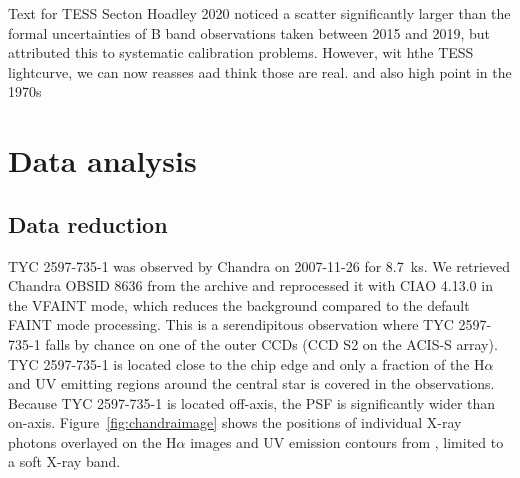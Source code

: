 \documentclass[linenumbers]{aastex631}
\begin{document}
Text for TESS Secton Hoadley 2020 noticed a scatter significantly larger than the formal uncertainties of B band observations taken between 2015 and 2019, but attributed this to systematic calibration problems. However, wit hthe TESS lightcurve, we can now reasses aad think those are real.  and also high point in the 1970s

\section{Data analysis} \label{sec:data}
\subsection{Data reduction}
TYC 2597-735-1 was observed by Chandra on 2007-11-26 for 8.7~ks. 
We retrieved Chandra OBSID 8636 from  the archive and reprocessed it with CIAO 4.13.0 \citep{2006SPIE.6270E..1VF} in the VFAINT mode, which reduces the background compared to the default FAINT mode processing. This is a serendipitous observation where TYC 2597-735-1 falls by chance on one of the outer CCDs (CCD S2 on the ACIS-S array). TYC 2597-735-1 is located close to the chip edge and only a fraction of the H$\alpha$ and UV emitting regions around the central star is covered in the observations. Because TYC 2597-735-1 is located off-axis, the PSF is significantly wider than on-axis. Figure~\ref{fig:chandraimage} shows the positions of individual X-ray photons overlayed on the H$\alpha$ images and UV emission contours from \citet{2020Natur.587..387H}, limited to a soft X-ray band. 
\end{document}
